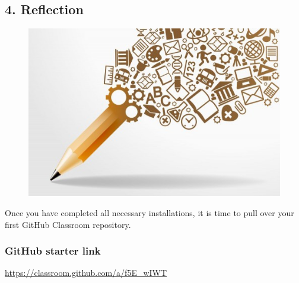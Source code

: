 \subsection*{4. Reflection}
\begin{figure}[ht!]
	\begin{center}
	 \includegraphics[scale=.4]{graphics/writing.jpg}
	\end{center}
\end{figure}

Once you have completed all necessary installations, it is time to pull over your first GitHub Classroom repository.

\subsubsection*{GitHub starter link}
\begin{center}
\color{red} \url{https://classroom.github.com/a/f5E_wIWT} \color{black}
\end{center}



